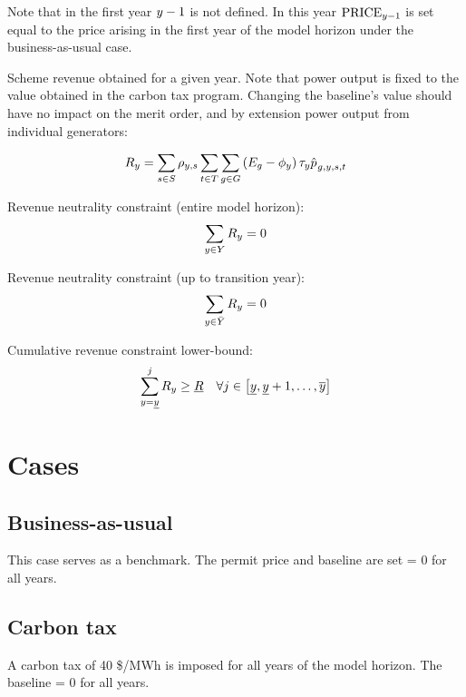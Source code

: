 \documentclass{article}
\begin{document}
Note that in the first year $\iYear - 1$ is not defined. In this year $\mathrm{PRICE}_{\iYear-1}$ is set equal to the price arising in the first year of the model horizon under the business-as-usual case.

Scheme revenue obtained for a given year. Note that power output is fixed to the value obtained in the carbon tax program. Changing the baseline's value should have no impact on the merit order, and by extension power output from individual generators:

\begin{equation}
R_{\iYear} = \sum\limits_{\iScenario \in \sScenarios} \cScenarioDuration \sum\limits_{\iInterval \in \sIntervals} \sum\limits_{\iGenerator \in \sGenerators} \left(\cEmissionsIntensity - \vBaseline \right) \vPermitPrice \hat{\vPower[]}_{\iGenerator,\iYear,\iScenario,\iInterval}
\end{equation}

Revenue neutrality constraint (entire model horizon):
\begin{equation}
\sum\limits_{\iYear \in \sYears} R_{\iYear} = 0
\end{equation}

Revenue neutrality constraint (up to transition year):
\begin{equation}
\sum\limits_{\iYear \in \bar{\sYears}} R_{\iYear} = 0
\end{equation}

Cumulative revenue constraint lower-bound:
\begin{equation}
\sum\limits_{\iYear=\iYearStart}^{\iYearAlias} R_{\iYear} \geq \underline{R} \quad \forall \iYearAlias \in \left[\iYearStart, \iYearStart + 1, \ldots, \iYearTerminal \right] 
\end{equation}

\section{Cases}
\subsection{Business-as-usual}
This case serves as a benchmark. The permit price and baseline are set = 0 for all years.

\subsection{Carbon tax}
A carbon tax of 40 \$/MWh is imposed for all years of the model horizon. The baseline = 0 for all years.
\end{document}
